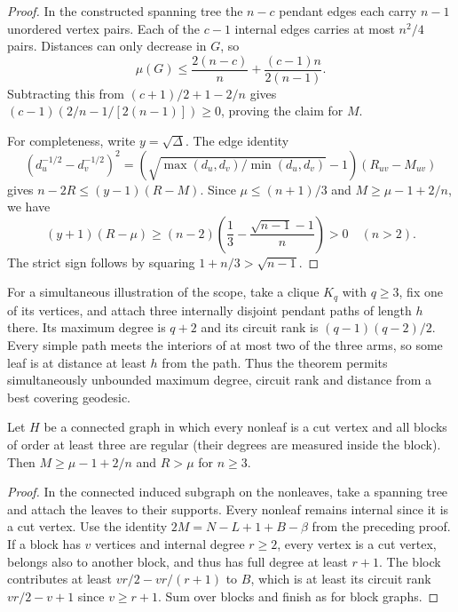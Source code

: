 \documentclass[11pt,a4paper]{article}
\begin{document}
\begin{proof}
In the constructed spanning tree the $n-c$ pendant edges each carry
$n-1$ unordered vertex pairs. Each of the $c-1$ internal edges carries
at most $n^2/4$ pairs. Distances can only decrease in $G$, so
\[
 \mu(G)\le \frac{2(n-c)}n+\frac{(c-1)n}{2(n-1)} .
\]
Subtracting this from $(c+1)/2+1-2/n$ gives
$(c-1)(2/n-1/[2(n-1)])\ge0$, proving the claim for $M$.

For completeness, write $y=\sqrt\Delta$. The edge identity
\[
(d_u^{-1/2}-d_v^{-1/2})^2
=(\sqrt{\max(d_u,d_v)/\min(d_u,d_v)}-1)(R_{uv}-M_{uv})
\]
gives $n-2R\le(y-1)(R-M)$. Since $\mu\le(n+1)/3$ and
$M\ge\mu-1+2/n$, we have
\[
 (y+1)(R-\mu)\ge(n-2)
      \left(\frac13-\frac{\sqrt{n-1}-1}{n}\right)>0
 \quad(n>2).
\]
The strict sign follows by squaring $1+n/3>\sqrt{n-1}$.
\end{proof}

For a simultaneous illustration of the scope, take a clique $K_q$
with $q\ge3$, fix one of its vertices, and attach three internally
disjoint pendant paths of length $h$ there. Its maximum degree is
$q+2$ and its circuit rank is $(q-1)(q-2)/2$. Every simple path meets
the interiors of at most two of the three arms, so some leaf is at
distance at least $h$ from the path. Thus the theorem permits
simultaneously unbounded maximum degree, circuit rank and distance
from a best covering geodesic.
\begin{corollary}
Let $H$ be a connected graph in which every nonleaf is a cut vertex and
all blocks of order at least three are regular (their degrees are measured
inside the block). Then $M\ge\mu-1+2/n$ and $R>\mu$ for $n\ge3$.
\end{corollary}
\begin{proof}
In the connected induced subgraph on the nonleaves, take a spanning
tree and attach the leaves to their supports. Every nonleaf remains
internal since it is a cut vertex. Use the identity $2M=N-L+1+B-\beta$
from the preceding proof. If a block has $v$ vertices and internal degree
$r\ge2$, every vertex is a cut vertex, belongs also to another block,
and thus has full degree at least $r+1$. The block contributes at least
$vr/2-vr/(r+1)$ to $B$, which is at least its circuit rank $vr/2-v+1$
since $v\ge r+1$. Sum over blocks and finish as for block graphs.
\end{proof}
\end{document}
